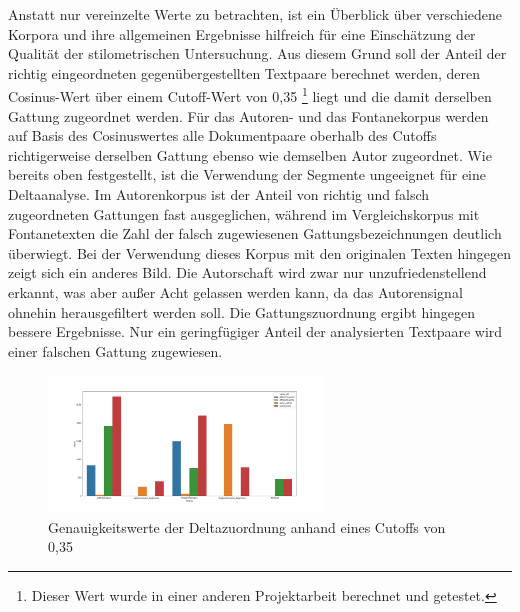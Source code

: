 \documentclass[a4paper,10p]{article}
\begin{document}
Anstatt nur vereinzelte Werte zu betrachten, ist ein Überblick über verschiedene Korpora und ihre allgemeinen Ergebnisse hilfreich für eine Einschätzung der Qualität der stilometrischen Untersuchung. Aus diesem Grund soll der Anteil der richtig eingeordneten gegenübergestellten Textpaare berechnet werden, deren Cosinus-Wert über einem Cutoff-Wert von 0,35 \footnote{Dieser Wert wurde in einer anderen Projektarbeit berechnet und getestet.} liegt und die damit derselben Gattung zugeordnet werden. Für das Autoren- und das Fontanekorpus werden auf Basis des Cosinuswertes alle Dokumentpaare oberhalb des Cutoffs richtigerweise derselben Gattung ebenso wie demselben Autor zugeordnet. Wie bereits oben festgestellt, ist die Verwendung der Segmente ungeeignet für eine Deltaanalyse. Im Autorenkorpus ist der Anteil von richtig und falsch zugeordneten Gattungen fast ausgeglichen, während im Vergleichskorpus mit Fontanetexten die Zahl der falsch zugewiesenen Gattungsbezeichnungen deutlich überwiegt. Bei der Verwendung dieses Korpus mit den originalen Texten hingegen zeigt sich ein anderes Bild. Die Autorschaft wird zwar nur unzufriedenstellend erkannt, was aber außer Acht gelassen werden kann, da das Autorensignal ohnehin herausgefiltert werden soll. Die Gattungszuordnung ergibt hingegen bessere Ergebnisse. Nur ein geringfügiger Anteil der analysierten Textpaare wird einer falschen Gattung zugewiesen. \par 

\begin{figure}
	\includegraphics[width=0.65\textwidth]{cutoffs_all.png}
	\caption{Genauigkeitswerte der Deltazuordnung anhand eines Cutoffs von 0,35}
	\label{fig:deltacutoff}
\end{figure}
\end{document}
